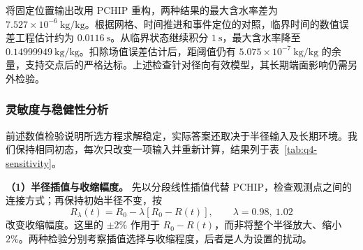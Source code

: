 \documentclass[UTF8,a4paper]{ctexart}
\begin{document}
将固定位置输出改用 PCHIP 重构，两种结果的最大含水率差为 \(7.527\times10^{-6}~\mathrm{kg/kg}\)。根据网格、时间推进和事件定位的对照，临界时间的数值误差工程估计约为 \(0.0116~\mathrm s\)。从临界状态继续积分 \(1~\mathrm s\)，最大含水率降至 \(0.14999949~\mathrm{kg/kg}\)。扣除场值误差估计后，距阈值仍有 \mbox{\(5.075\times10^{-7}~\mathrm{kg/kg}\)} 的余量，支持交点后的严格达标。上述检查针对径向有效模型，其长期端面影响仍需另外检验。

\subsubsection{灵敏度与稳健性分析}
\label{sec:q4-sensitivity}

前述数值检验说明所选方程求解稳定，实际答案还取决于半径输入及长期环境。我们保持相同初态，每次只改变一项输入并重新计算，结果列于表~\ref{tab:q4-sensitivity}。

\noindent\textbf{（1）半径插值与收缩幅度。}
先以分段线性插值代替 PCHIP，检查观测点之间的连接方式；再保持初始半径不变，按
\begin{equation}
R_\lambda(t)=R_0-\lambda[R_0-R(t)],\qquad
\lambda=0.98,\ 1.02
\label{eq:q4-radius-perturbation}
\end{equation}
改变收缩幅度。这里的 \(\pm2\%\) 作用于 \(R_0-R(t)\)，而非将整个半径放大、缩小 \(2\%\)。两种检验分别考察插值选择与收缩程度，后者是人为设置的扰动。
\end{document}
